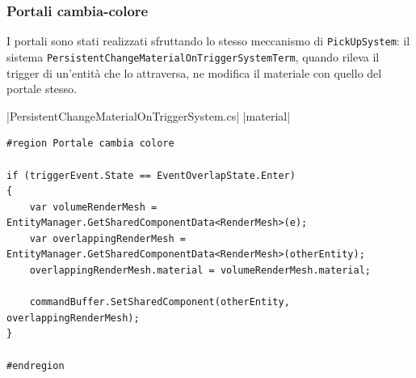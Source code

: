 \subsubsection{Portali cambia-colore}

I portali sono stati realizzati sfruttando lo stesso meccanismo di \verb|PickUpSystem|:
il sistema \verb|PersistentChangeMaterialOnTriggerSystemTerm|, quando rileva il trigger di un'entità che lo attraversa, ne modifica il materiale con quello del portale stesso.

|PersistentChangeMaterialOnTriggerSystem.cs|
|material|

\begin{lstlisting}[caption={File \UseVerb{PersistentChangeMaterialOnTriggerSystemTerm}: aggiornamento del valore della proprietà \UseVerb{materialTerm} con quello del portale.}, label={lst:prototipo-portal-material}, language={[Sharp]C}]
#region Portale cambia colore

if (triggerEvent.State == EventOverlapState.Enter)
{
    var volumeRenderMesh = EntityManager.GetSharedComponentData<RenderMesh>(e);
    var overlappingRenderMesh = EntityManager.GetSharedComponentData<RenderMesh>(otherEntity);
    overlappingRenderMesh.material = volumeRenderMesh.material;

    commandBuffer.SetSharedComponent(otherEntity, overlappingRenderMesh);
}

#endregion
\end{lstlisting}

